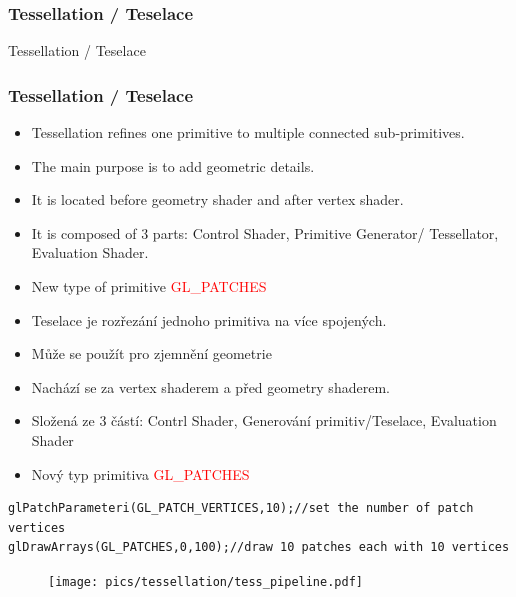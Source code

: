 \begin{frame}
\frametitle{Tessellation / Teselace}
\begin{center}
\Huge {\color{white} Tessellation / Teselace}
\end{center}
\end{frame}

\begin{frame}[fragile]
\frametitle{Tessellation / Teselace}
  \scriptsize
	\begin{itemize}
	\item Tessellation refines one primitive to multiple connected sub-primitives.
	\item The main purpose is to add geometric details.
	\item It is located before geometry shader and after vertex shader.
	\item It is composed of 3 parts: Control Shader, Primitive Generator/ Tessellator, Evaluation Shader.
	\item New type of primitive \textcolor{red}{GL\_PATCHES}
	\end{itemize}
	\begin{itemize}
	\item Teselace je rozřezání jednoho primitiva na více spojených.
	\item Může se použít pro zjemnění geometrie
	\item Nachází se za vertex shaderem a před geometry shaderem.
	\item Složená ze 3 částí: Contrl Shader, Generování primitiv/Teselace, Evaluation Shader
	\item Nový typ primitiva \textcolor{red}{GL\_PATCHES}
	\end{itemize}
  {\scriptsize
\begin{verbatim}
glPatchParameteri(GL_PATCH_VERTICES,10);//set the number of patch vertices
glDrawArrays(GL_PATCHES,0,100);//draw 10 patches each with 10 vertices
	\end{verbatim}
  }
	\begin{figure}[h]
	\texttt{[image: pics/tessellation/tess\_pipeline.pdf]}
	\end{figure}
\end{frame}

